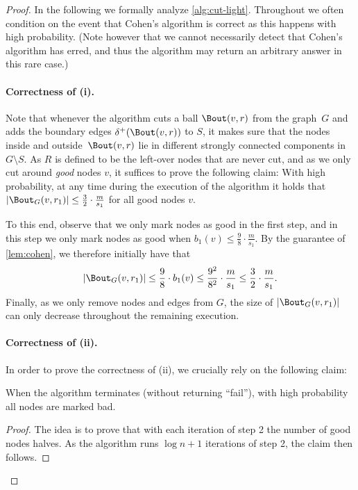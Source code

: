 \begin{proof}
In the following we formally analyze \cref{alg:cut-light}. Throughout we often condition on the event that Cohen's algorithm is correct as this happens with high probability. (Note however that we cannot necessarily detect that Cohen's algorithm has erred, and thus the algorithm may return an arbitrary answer in this rare case.)

\paragraph{Correctness of (i).}
Note that whenever the algorithm cuts a ball $\Bout(v, r)$ from the graph~$G$ and adds the boundary edges $\delta^+(\Bout(v, r))$ to $S$, it makes sure that the nodes inside and outside~$\Bout(v, r)$ lie in different strongly connected components in $G \setminus S$. As $R$ is defined to be the left-over nodes that are never cut, and as we only cut around \emph{good} nodes $v$, it suffices to prove the following claim: With high probability, at any time during the execution of the algorithm it holds that $|\Bout_G(v, r_1)| \leq \frac32 \cdot \frac{m}{s_1}$ for all good nodes $v$.

To this end, observe that we only mark nodes as good in the first step, and in this step we only mark nodes as good when $b_1(v) \leq \frac98 \cdot \frac{m}{s_1}$. By the guarantee of \cref{lem:cohen}, we therefore initially have that
\begin{equation*}
    |\Bout_G(v, r_1)| \leq \frac98 \cdot b_1(v) \leq \frac{9^2}{8^2} \cdot \frac{m}{s_1} \leq \frac{3}{2} \cdot \frac{m}{s_1}.
\end{equation*}
Finally, as we only remove nodes and edges from $G$, the size of $|\Bout_G(v, r_1)|$ can only decrease throughout the remaining execution.

\paragraph{Correctness of (ii).}
In order to prove the correctness of (ii), we crucially rely on the following claim:

\begin{claim}
When the algorithm terminates (without returning ``fail''), with high probability all nodes are marked bad.
\end{claim}
\begin{proof}
The idea is to prove that with each iteration of step 2 the number of good nodes halves. As the algorithm runs $\log n + 1$ iterations of step 2, the claim then follows.


\end{proof}
\end{proof}
